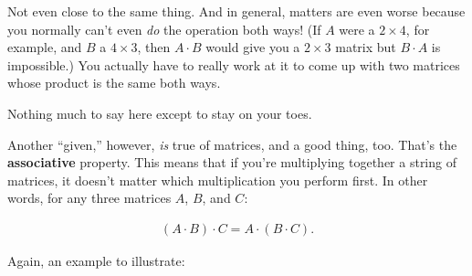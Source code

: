 Not even close to the same thing. And in general, matters are even worse
because you normally can't even \textit{do} the operation both ways! (If $A$
were a $2\times 4$, for example, and $B$ a $4\times 3$, then $A \cdot B$ would
give you a $2\times 3$ matrix but $B \cdot A$ is impossible.) You actually have
to really work at it to come up with two matrices whose product is the same
both ways.

Nothing much to say here except to stay on your toes.

Another ``given,'' however, \textit{is} true of matrices, and a good thing,
too. That's the \textbf{associative} property. This means that if you're
multiplying together a string of matrices, it doesn't matter which
multiplication you perform first. In other words, for any three matrices $A$,
$B$, and $C$:

\vspace{-.15in}
\begin{align*}
(A \cdot B) \cdot C =
A \cdot (B \cdot C).
\end{align*}
\vspace{-.15in}

\label{associativityExample}

Again, an example to illustrate:

